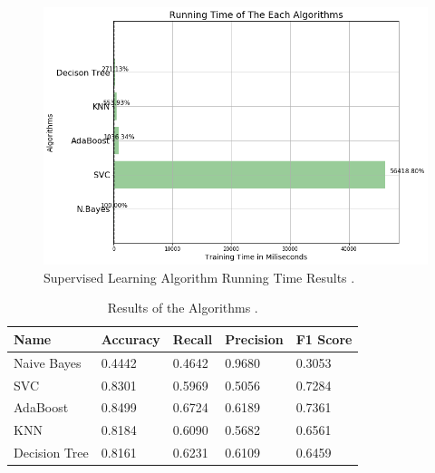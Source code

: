 \documentclass[sigconf]{acmart}
\begin{document}
\begin{figure}[!ht]
  \centering
      \includegraphics[width=\columnwidth]{images/running-time.png}
  \caption{Supervised Learning Algorithm Running Time Results \cite{Borga2017}.}\label{fig:result-time}
\end{figure}

\begin{table}[!ht]
\centering
\begin{tabular}{lllll}
\hline
Name                                & Accuracy                    & Recall                      & Precision                   & F1 Score                    \\ \hline
\multicolumn{1}{|l|}{Naive Bayes}   & \multicolumn{1}{l|}{0.4442} & \multicolumn{1}{l|}{0.4642} & \multicolumn{1}{l|}{0.9680} & \multicolumn{1}{l|}{0.3053} \\ \hline
\multicolumn{1}{|l|}{SVC}           & \multicolumn{1}{l|}{0.8301} & \multicolumn{1}{l|}{0.5969} & \multicolumn{1}{l|}{0.5056} & \multicolumn{1}{l|}{0.7284} \\ \hline
\multicolumn{1}{|l|}{AdaBoost}      & \multicolumn{1}{l|}{0.8499} & \multicolumn{1}{l|}{0.6724} & \multicolumn{1}{l|}{0.6189} & \multicolumn{1}{l|}{0.7361} \\ \hline
\multicolumn{1}{|l|}{KNN}           & \multicolumn{1}{l|}{0.8184} & \multicolumn{1}{l|}{0.6090} & \multicolumn{1}{l|}{0.5682} & \multicolumn{1}{l|}{0.6561} \\ \hline
\multicolumn{1}{|l|}{Decision Tree} & \multicolumn{1}{l|}{0.8161} & \multicolumn{1}{l|}{0.6231} & \multicolumn{1}{l|}{0.6109} & \multicolumn{1}{l|}{0.6459} \\ \hline
\end{tabular}
\caption{Results of the Algorithms \cite{Borga2017}.}
\label{result-table}
\end{table}
\end{document}
